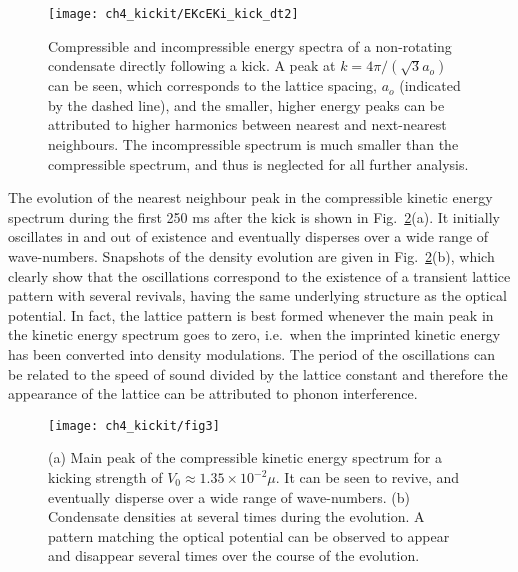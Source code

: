 \begin{figure}[tb]
    \centering
    \texttt{[image: ch4\_kickit/EKcEKi\_kick\_dt2]}
    \caption[Time-averaged compressible and incompressible energy spectra of a non-rotating condensate directly following a kick.]{Compressible and incompressible energy spectra of a non-rotating condensate directly following a kick. A peak at $k=4\pi/(\sqrt{3}a_o)$ can be seen, which corresponds to the lattice spacing, $a_o$ (indicated by the dashed line), and the smaller, higher energy peaks can be attributed to higher harmonics between nearest and next-nearest neighbours. The incompressible spectrum is much smaller than the compressible spectrum, and thus is neglected for all further analysis.}
    \label{fig:ekc_eki_novtx}
\end{figure}


The evolution of the nearest neighbour peak in the compressible kinetic energy spectrum during the first 250 ms after the kick is shown in Fig.~\ref{fig:novtx_p5k}(a). It initially oscillates in and out of existence and eventually disperses over a wide range of wave-numbers. Snapshots of the density evolution are given in Fig.~\ref{fig:novtx_p5k}(b), which clearly show that the oscillations correspond to the existence of a transient lattice pattern with several revivals, having the same underlying structure as the optical potential. In fact, the lattice pattern is best formed whenever the main peak in the kinetic energy spectrum goes to zero, i.e.~when the imprinted kinetic energy has been converted into density modulations. The period of the oscillations can be related to the speed of sound divided by the lattice constant and therefore the appearance of the lattice can be attributed to phonon interference.

\begin{figure}[tb]
    \centering

	\texttt{[image: ch4\_kickit/fig3]}
	\caption[Effect of kicking on non-rotating condensate.]{(a) Main peak of the compressible kinetic energy spectrum for a kicking strength of $V_0 \approx 1.35\times10^{-2}\mu$. It can be seen to revive, and eventually disperse over a wide range of wave-numbers.  (b) Condensate densities at several times during the evolution. A pattern matching the optical potential can be observed to appear and disappear several times over the course of the evolution.}
	\label{fig:novtx_p5k}
\end{figure}


